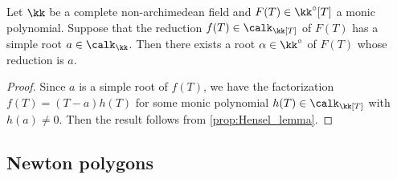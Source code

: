     \begin{corollary}\label{prop:Hensel_lemma_to_solve_polynomial}
        Let \(\kk\) be a complete non-archimedean field and \(F(T) \in \kk^\circ[T]\) a monic polynomial.
        Suppose that the reduction \(f(T) \in \calk_\kk[T]\) of \(F(T)\) has a simple root \(a \in \calk_\kk\).
        Then there exists a root \(\alpha \in \kk^\circ\) of \(F(T)\) whose reduction is \(a\).
    \end{corollary}
    \begin{proof}
        Since \(a\) is a simple root of \(f(T)\), we have the factorization \(f(T) = (T - a) h(T)\) for some monic polynomial \(h(T) \in \calk_\kk[T]\) with \(h(a) \neq 0\).
        Then the result follows from \cref{prop:Hensel_lemma}.
    \end{proof}


\subsection{Newton polygons}

